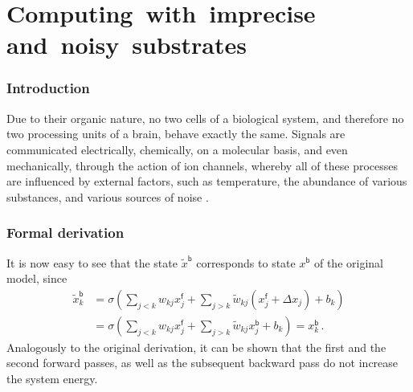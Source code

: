\documentclass[b5paper,widemargins,twoside,printrev]{jb-thesis}
\begin{document}
 \part{Computing~with~imprecise and~noisy~substrates}

 \mbox{}
 \section*{Introduction}

 Due to their organic nature, no two cells of a biological system, and therefore no two processing units of a brain, behave exactly the same.
 Signals are communicated electrically, chemically, on a molecular basis, and even mechanically, through the action of ion channels, whereby all of these processes are influenced by external factors, such as temperature, the abundance of various substances, and various sources of noise \citep{shadlen1994noise}.

 \section{Formal derivation}

 It is now easy to see that the state $\tilde{x}^\mathsf{b}$ corresponds to state $x^\mathsf{b}$ of the original model, since
 \begin{align}
     \tilde{x}^\mathsf{b}_k &= \sigma\left(\sum_{j<k} w_{kj} x^\mathsf{f}_j + \sum_{j>k} \tilde{w}_{kj} (x^\mathsf{f}_j + \Delta x_j) + b_k\right) \\
	&=  \sigma\left(\sum_{j<k} w_{kj} x^\mathsf{f}_j + \sum_{j>k} \tilde{w}_{kj} x^\mathsf{b}_j + b_k\right) = x^\mathsf{b}_k\,.
     \label{eqn:random1}
 \end{align}
 Analogously to the original derivation, it can be shown that the first and the second forward passes, as well as the subsequent backward pass do not increase the system energy.



 \printbibliography
\end{document}
